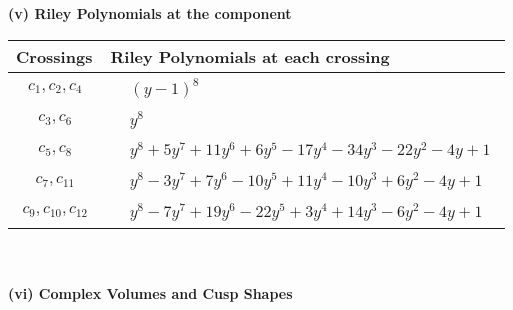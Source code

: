 \documentclass[1p]{elsarticle_modified}
\theoremstyle{definition}
\begin{document}
\newpage\renewcommand{\arraystretch}{1}
\flushleft \textbf{(v) Riley Polynomials at the component}\newline \\
\begin{tabular}{m{50pt}|m{274pt}}
Crossings & \hspace{64pt}Riley Polynomials at each crossing \\
\hline $$\begin{aligned}c_{1},c_{2},c_{4}\end{aligned}$$&$\begin{aligned}
&(y-1)^8
\end{aligned}$\\
\hline $$\begin{aligned}c_{3},c_{6}\end{aligned}$$&$\begin{aligned}
&y^8
\end{aligned}$\\
\hline $$\begin{aligned}c_{5},c_{8}\end{aligned}$$&$\begin{aligned}
&y^8+5 y^7+11 y^6+6 y^5-17 y^4-34 y^3-22 y^2-4 y+1
\end{aligned}$\\
\hline $$\begin{aligned}c_{7},c_{11}\end{aligned}$$&$\begin{aligned}
&y^8-3 y^7+7 y^6-10 y^5+11 y^4-10 y^3+6 y^2-4 y+1
\end{aligned}$\\
\hline $$\begin{aligned}c_{9},c_{10},c_{12}\end{aligned}$$&$\begin{aligned}
&y^8-7 y^7+19 y^6-22 y^5+3 y^4+14 y^3-6 y^2-4 y+1
\end{aligned}$\\
\hline
\end{tabular}\\~\\
\newpage\flushleft \textbf{(vi) Complex Volumes and Cusp Shapes}
\end{document}
